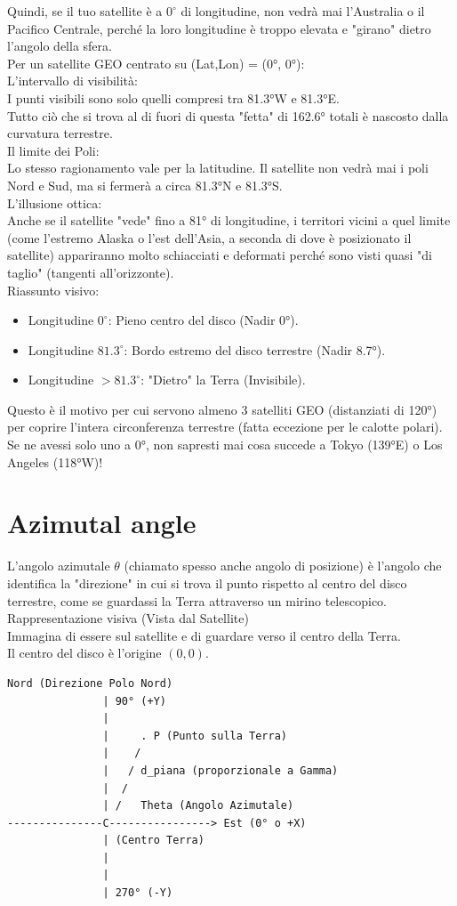 \documentclass[a4paper,14pt]{article}
\begin{document}
Quindi, se il tuo satellite è a \(0^{\circ }\) di longitudine, non vedrà mai l'Australia o il Pacifico Centrale, perché la loro longitudine è troppo elevata e "girano" dietro l'angolo della sfera.\\
Per un satellite GEO centrato su (Lat,Lon) = (0°, 0°):\\
L'intervallo di visibilità:\\
I punti visibili sono solo quelli compresi tra 81.3°W e 81.3°E.\\
Tutto ciò che si trova al di fuori di questa "fetta" di 162.6° totali è nascosto dalla curvatura terrestre.\\
Il limite dei Poli:\\
Lo stesso ragionamento vale per la latitudine. Il satellite non vedrà mai i poli Nord e Sud, ma si fermerà a circa 81.3°N e 81.3°S.\\
L'illusione ottica:\\
Anche se il satellite "vede" fino a 81° di longitudine, i territori vicini a quel limite (come l'estremo Alaska o l'est dell'Asia, a seconda di dove è posizionato il satellite) appariranno molto schiacciati e deformati perché sono visti quasi "di taglio" (tangenti all'orizzonte).\\
Riassunto visivo:
\begin{itemize}
\item Longitudine \(0^{\circ }\): Pieno centro del disco (Nadir 0°).
\item Longitudine \(81.3^{\circ }\): Bordo estremo del disco terrestre (Nadir 8.7°).
\item Longitudine \(>81.3^{\circ }\): "Dietro" la Terra (Invisibile).
\end{itemize}
Questo è il motivo per cui servono almeno 3 satelliti GEO (distanziati di 120°) per coprire l'intera circonferenza terrestre (fatta eccezione per le calotte polari). Se ne avessi solo uno a 0°, non sapresti mai cosa succede a Tokyo (139°E) o Los Angeles (118°W)!
\section{Azimutal angle}
L'angolo azimutale \(\theta \) (chiamato spesso anche angolo di posizione) è l'angolo che identifica la "direzione" in cui si trova il punto rispetto al centro del disco terrestre, come se guardassi la Terra attraverso un mirino telescopico.\\
Rappresentazione visiva (Vista dal Satellite)\\
Immagina di essere sul satellite e di guardare verso il centro della Terra.\\
Il centro del disco è l'origine \((0,0)\).\\
\begin{verbatim}
Nord (Direzione Polo Nord)
               | 90° (+Y)
               |
               |     . P (Punto sulla Terra)
               |    /
               |   / d_piana (proporzionale a Gamma)
               |  /
               | /   Theta (Angolo Azimutale)
---------------C----------------> Est (0° o +X)
               | (Centro Terra)
               |
               |
               | 270° (-Y)
\end{verbatim}
\end{document}
